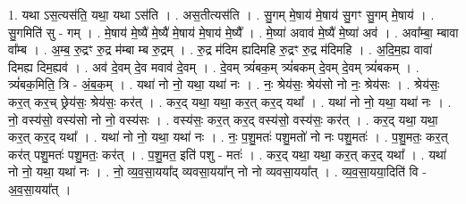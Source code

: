 \documentclass[17pt]{extarticle}
\begin{document}
1. यथा ऽस॒त्यस॑ति॒ यथा॒ यथा ऽस॑ति । . अस॒तीत्यस॑ति । . सु॒गम् मे॒षाय॑ मे॒षाय॑ सु॒गꣳ सु॒गम् मे॒षाय॑ । . सु॒गमिति॑ सु - गम् । . मे॒षाय॑ मे॒ष्यै॑ मे॒ष्यै॑ मे॒षाय॑ मे॒षाय॑ मे॒ष्यै᳚ । . मे॒ष्या॑ अवाव॑ मे॒ष्यै॑ मे॒ष्या॑ अव॑ । . अवा᳚म्बा॒ म्बावा वा᳚म्ब । . अ॒म्ब॒ रु॒द्रꣳ रु॒द्र म॑म्बा म्ब रु॒द्रम् । . रु॒द्र म॑दिम ह्यदिमहि रु॒द्रꣳ रु॒द्र म॑दिमहि । . अ॒दि॒म॒ह्य वावा॑ दिमह्य दिम॒ह्यव॑ । . अव॑ दे॒वम् दे॒व मवाव॑ दे॒वम् । . दे॒वम् त्र्यं॑बक॒म् त्र्यं॑बकम् दे॒वम् दे॒वम् त्र्यं॑बकम् । . त्र्यं॑बक॒मिति॒ त्रि - अं॒ब॒क॒म् । . यथा॑ नो नो॒ यथा॒ यथा॑ नः । . नः॒ श्रेय॑सः॒ श्रेय॑सो नो नः॒ श्रेय॑सः । . श्रेय॑सः॒ कर॒त् कर॒च् छ्रेय॑सः॒ श्रेय॑सः॒ कर॑त् । . कर॒द् यथा॒ यथा॒ कर॒त् कर॒द् यथा᳚ । . यथा॑ नो नो॒ यथा॒ यथा॑ नः । . नो॒ वस्य॑सो॒ वस्य॑सो नो नो॒ वस्य॑सः । . वस्य॑सः॒ कर॒त् कर॒द् वस्य॑सो॒ वस्य॑सः॒ कर॑त् । . कर॒द् यथा॒ यथा॒ कर॒त् कर॒द् यथा᳚ । . यथा॑ नो नो॒ यथा॒ यथा॑ नः । . नः॒ प॒शु॒मतः॑ पशु॒मतो॑ नो नः पशु॒मतः॑ । . प॒शु॒मतः॒ कर॒त् कर॑त् पशु॒मतः॑ पशु॒मतः॒ कर॑त् । . प॒शु॒मत॒ इति॑ पशु - मतः॑ । . कर॒द् यथा॒ यथा॒ कर॒त् कर॒द् यथा᳚ । . यथा॑ नो नो॒ यथा॒ यथा॑ नः । . नो॒ व्य॒व॒सा॒यया᳚द् व्यवसा॒यया᳚न् नो नो व्यवसा॒यया᳚त् । . व्य॒व॒सा॒यया॒दिति॑ वि - अ॒व॒सा॒यया᳚त् । \newline
\end{document}
